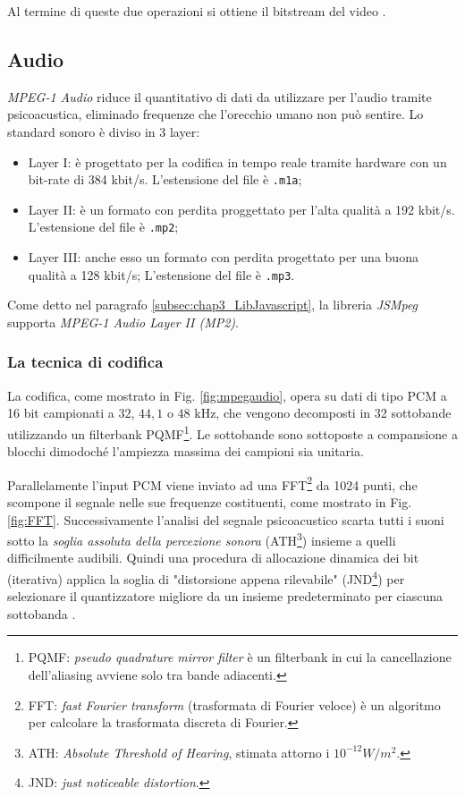Al termine di queste due operazioni si ottiene il bitstream del video \parencite{jurgem_1997}.




\subsection{Audio}
\textit{MPEG-1 Audio} riduce il quantitativo di dati da utilizzare per l'audio tramite psicoacustica, eliminado frequenze che l'orecchio umano non può sentire. Lo standard sonoro è diviso in 3 layer:

\begin{itemize}
	\item Layer I: è progettato per la codifica in tempo reale tramite hardware con un bit-rate di 384 kbit/s. L'estensione del file è \verb|.m1a|;
	\item Layer II: è un formato con perdita proggettato per l'alta qualità a 192 kbit/s. L'estensione del file è \verb|.mp2|;
	\item Layer III: anche esso un formato con perdita progettato per una buona qualità a 128 kbit/s; L'estensione del file è \verb|.mp3|.
\end{itemize}

Come detto nel paragrafo \ref{subsec:chap3_LibJavascript}, la libreria \textit{JSMpeg} supporta \textit{MPEG-1 Audio Layer II (MP2)}.

\subsubsection{La tecnica di codifica}
La codifica, come mostrato in Fig. \ref{fig:mpegaudio}, opera su dati di tipo PCM a 16 bit campionati a $32$, $44,1$ o $48$ kHz, che vengono decomposti in 32 sottobande utilizzando un filterbank PQMF\footnote{PQMF: \textit{pseudo quadrature mirror filter} è un filterbank in cui la cancellazione dell'aliasing avviene solo tra bande adiacenti.}. Le sottobande sono sottoposte a compansione a blocchi dimodoché l'ampiezza massima dei campioni sia unitaria.

Parallelamente l'input PCM viene inviato ad una FFT\footnote{FFT: \textit{fast Fourier transform} (trasformata di Fourier veloce) è un algoritmo per calcolare la trasformata discreta di Fourier.} da 1024 punti, che scompone il segnale nelle sue frequenze costituenti, come mostrato in Fig. \ref{fig:FFT}. Successivamente l'analisi del segnale psicoacustico scarta tutti i suoni sotto la \textit{soglia assoluta della percezione sonora} (ATH\footnote{ATH: \textit{Absolute Threshold of Hearing}, stimata attorno i $10^{-12} W/m^{2}$.}) insieme a quelli difficilmente audibili. Quindi una procedura di allocazione dinamica dei bit (iterativa) applica la soglia di "distorsione appena rilevabile" (JND\footnote{JND: \textit{just noticeable distortion}.}) per selezionare il quantizzatore migliore da un insieme predeterminato per ciascuna sottobanda \parencite{AudioSignalProcessingAndCoding}.

